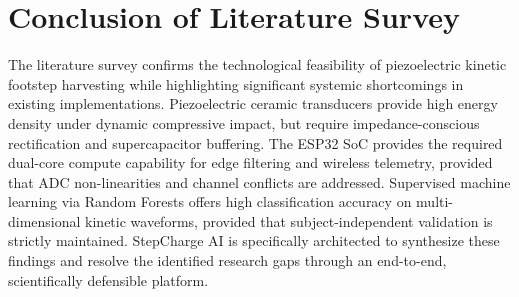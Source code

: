 \section{Conclusion of Literature Survey}
The literature survey confirms the technological feasibility of piezoelectric kinetic footstep harvesting while highlighting significant systemic shortcomings in existing implementations. Piezoelectric ceramic transducers provide high energy density under dynamic compressive impact, but require impedance-conscious rectification and supercapacitor buffering. The ESP32 SoC provides the required dual-core compute capability for edge filtering and wireless telemetry, provided that ADC non-linearities and channel conflicts are addressed. Supervised machine learning via Random Forests offers high classification accuracy on multi-dimensional kinetic waveforms, provided that subject-independent validation is strictly maintained. StepCharge AI is specifically architected to synthesize these findings and resolve the identified research gaps through an end-to-end, scientifically defensible platform.
